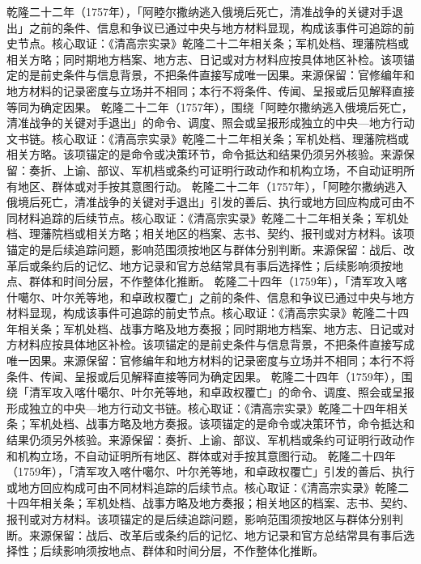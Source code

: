乾隆二十二年（1757年），「阿睦尔撒纳逃入俄境后死亡，清准战争的关键对手退出」之前的条件、信息和争议已通过中央与地方材料显现，构成该事件可追踪的前史节点。核心取证：《清高宗实录》乾隆二十二年相关条；军机处档、理藩院档或相关方略；同时期地方档案、地方志、日记或对方材料应按具体地区补检。该项锚定的是前史条件与信息背景，不把条件直接写成唯一因果。来源保留：官修编年和地方材料的记录密度与立场并不相同；本行不将条件、传闻、呈报或后见解释直接等同为确定因果。
乾隆二十二年（1757年），围绕「阿睦尔撒纳逃入俄境后死亡，清准战争的关键对手退出」的命令、调度、照会或呈报形成独立的中央—地方行动文书链。核心取证：《清高宗实录》乾隆二十二年相关条；军机处档、理藩院档或相关方略。该项锚定的是命令或决策环节，命令抵达和结果仍须另外核验。来源保留：奏折、上谕、部议、军机档或条约可证明行政动作和机构立场，不自动证明所有地区、群体或对手按其意图行动。
乾隆二十二年（1757年），「阿睦尔撒纳逃入俄境后死亡，清准战争的关键对手退出」引发的善后、执行或地方回应构成可由不同材料追踪的后续节点。核心取证：《清高宗实录》乾隆二十二年相关条；军机处档、理藩院档或相关方略；相关地区的档案、志书、契约、报刊或对方材料。该项锚定的是后续追踪问题，影响范围须按地区与群体分别判断。来源保留：战后、改革后或条约后的记忆、地方记录和官方总结常具有事后选择性；后续影响须按地点、群体和时间分层，不作整体化推断。
乾隆二十四年（1759年），「清军攻入喀什噶尔、叶尔羌等地，和卓政权覆亡」之前的条件、信息和争议已通过中央与地方材料显现，构成该事件可追踪的前史节点。核心取证：《清高宗实录》乾隆二十四年相关条；军机处档、战事方略及地方奏报；同时期地方档案、地方志、日记或对方材料应按具体地区补检。该项锚定的是前史条件与信息背景，不把条件直接写成唯一因果。来源保留：官修编年和地方材料的记录密度与立场并不相同；本行不将条件、传闻、呈报或后见解释直接等同为确定因果。
乾隆二十四年（1759年），围绕「清军攻入喀什噶尔、叶尔羌等地，和卓政权覆亡」的命令、调度、照会或呈报形成独立的中央—地方行动文书链。核心取证：《清高宗实录》乾隆二十四年相关条；军机处档、战事方略及地方奏报。该项锚定的是命令或决策环节，命令抵达和结果仍须另外核验。来源保留：奏折、上谕、部议、军机档或条约可证明行政动作和机构立场，不自动证明所有地区、群体或对手按其意图行动。
乾隆二十四年（1759年），「清军攻入喀什噶尔、叶尔羌等地，和卓政权覆亡」引发的善后、执行或地方回应构成可由不同材料追踪的后续节点。核心取证：《清高宗实录》乾隆二十四年相关条；军机处档、战事方略及地方奏报；相关地区的档案、志书、契约、报刊或对方材料。该项锚定的是后续追踪问题，影响范围须按地区与群体分别判断。来源保留：战后、改革后或条约后的记忆、地方记录和官方总结常具有事后选择性；后续影响须按地点、群体和时间分层，不作整体化推断。
